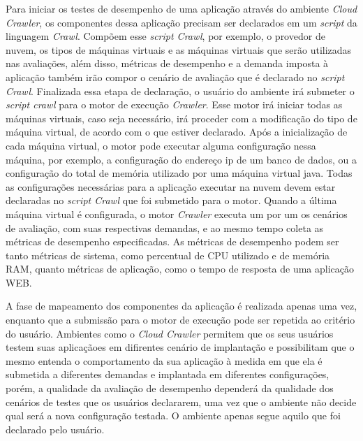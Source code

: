 Para iniciar os testes de desempenho de uma aplicação através do ambiente {\em Cloud Crawler}, os componentes dessa aplicação precisam ser declarados em um \textit{script} da linguagem {\em Crawl}. Compõem esse \textit{script Crawl}, por exemplo, o provedor de nuvem, os tipos de máquinas virtuais e as máquinas virtuais que serão utilizadas nas avaliações, além disso, métricas de desempenho e a demanda imposta à aplicação também irão compor o cenário de avaliação que é declarado no \textit{script Crawl}. Finalizada essa etapa de declaração, o usuário do ambiente irá submeter o \textit{script crawl} para o motor de execução {\em Crawler}. Esse motor irá iniciar todas as máquinas virtuais, caso seja necessário, irá proceder com a modificação do tipo de máquina virtual, de acordo com o que estiver declarado. Após a inicialização de cada máquina virtual, o motor pode executar alguma configuração nessa máquina, por exemplo, a configuração do endereço ip de um banco de dados, ou a configuração do total de memória utilizado por uma máquina virtual java. Todas as configurações necessárias para a aplicação executar na nuvem devem estar declaradas no {\em script Crawl} que foi submetido para o motor. Quando a última máquina virtual é configurada, o motor {\em Crawler} executa um por um os cenários de avaliação, com suas respectivas demandas, e ao mesmo tempo coleta as métricas de desempenho especificadas. As métricas de desempenho podem ser tanto métricas de sistema, como percentual de CPU utilizado e de memória RAM, quanto métricas de aplicação, como o tempo de resposta de uma aplicação WEB.

A fase de mapeamento dos componentes da aplicação é realizada apenas uma vez, enquanto que a submissão para o motor de execução pode ser repetida ao critério do usuário. Ambientes como o {\em Cloud Crawler} permitem que os seus usuários testem suas aplicaçãoes em difirentes cenário de implantação e possibilitam que o mesmo entenda o comportamento da sua aplicação à medida em que ela é submetida a diferentes demandas e implantada em diferentes configurações, porém, a qualidade da avaliação de desempenho dependerá da qualidade dos cenários de testes que os usuários declararem, uma vez que o ambiente não decide qual será a nova configuração testada. O ambiente apenas segue aquilo que foi declarado pelo usuário.

